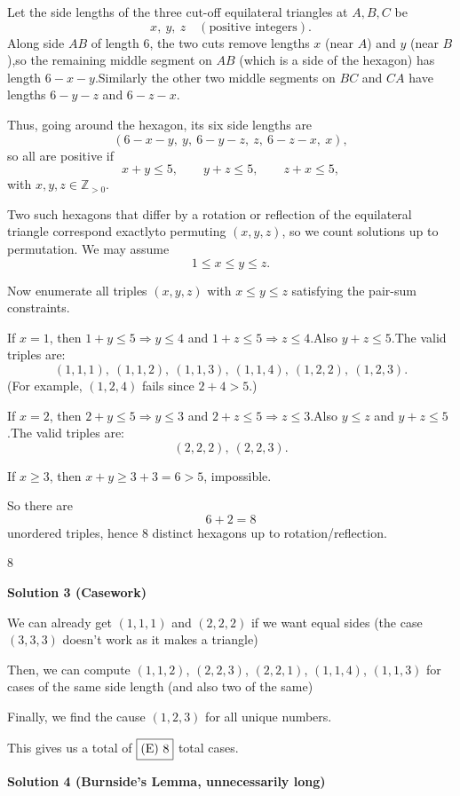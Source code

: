 \begin{enumerate}
 Let the side lengths of the three cut-off equilateral triangles at $A,B,C$ be
 \[x,\ y,\ z \quad (\text{positive integers}).\]Along side $AB$ of length $6$, the two cuts remove lengths $x$ (near $A$) and $y$ (near $B$),so the remaining middle segment on $AB$ (which is a side of the hexagon) has length $6-x-y$.Similarly the other two middle segments on $BC$ and $CA$ have lengths $6-y-z$ and $6-z-x$.

 Thus, going around the hexagon, its six side lengths are
 \[(6-x-y,\ y,\ 6-y-z,\ z,\ 6-z-x,\ x),\]so all are positive if
 \[x+y\le 5,\qquad y+z\le 5,\qquad z+x\le 5,\]with $x,y,z\in \mathbb{Z}_{>0}$.

 Two such hexagons that differ by a rotation or reflection of the equilateral triangle correspond exactlyto permuting $(x,y,z)$, so we count solutions up to permutation. We may assume
 \[1\le x\le y\le z.\]

 Now enumerate all triples $(x,y,z)$ with $x\le y\le z$ satisfying the pair-sum constraints.

 If $x=1$, then $1+y\le 5\Rightarrow y\le 4$ and $1+z\le 5\Rightarrow z\le 4$.Also $y+z\le 5$.The valid triples are:
 \[(1,1,1),\ (1,1,2),\ (1,1,3),\ (1,1,4),\ (1,2,2),\ (1,2,3).\](For example, $(1,2,4)$ fails since $2+4>5$.)

 If $x=2$, then $2+y\le 5\Rightarrow y\le 3$ and $2+z\le 5\Rightarrow z\le 3$.Also $y\le z$ and $y+z\le 5$.The valid triples are:
 \[(2,2,2),\ (2,2,3).\]

 If $x\ge 3$, then $x+y\ge 3+3=6>5$, impossible.

 So there are
 \[6+2=8\]unordered triples, hence $8$ distinct hexagons up to rotation/reflection.

 $\boxed{8}$




\textbf{Solution 3 (Casework)}

We can already get $(1,1,1)$ and $(2,2,2)$ if we want equal sides (the case $(3,3,3)$ doesn't work as it makes a triangle)

 Then, we can compute $(1,1,2)$, $(2,2,3)$, $(2,2,1)$, $(1,1,4)$, $(1,1,3)$ for cases of the same side length (and also two of the same)

 Finally, we find the cause $(1,2,3)$ for all unique numbers.

 This gives us a total of $\fbox{(E)\ 8}$ total cases.

 



\textbf{Solution 4 (Burnside's Lemma, unnecessarily long)}


\end{enumerate}
